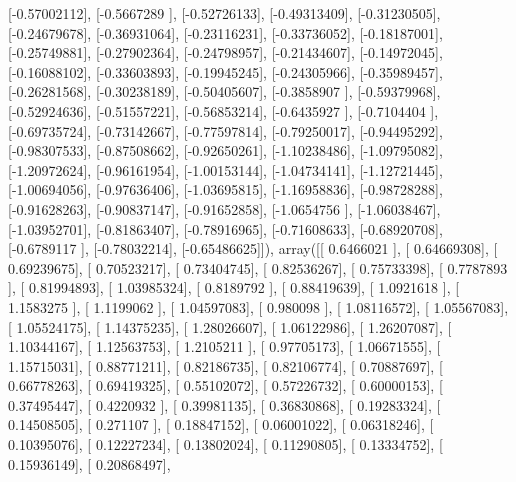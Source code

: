 \documentclass{article}
\begin{document}
       [-0.57002112],
       [-0.5667289 ],
       [-0.52726133],
       [-0.49313409],
       [-0.31230505],
       [-0.24679678],
       [-0.36931064],
       [-0.23116231],
       [-0.33736052],
       [-0.18187001],
       [-0.25749881],
       [-0.27902364],
       [-0.24798957],
       [-0.21434607],
       [-0.14972045],
       [-0.16088102],
       [-0.33603893],
       [-0.19945245],
       [-0.24305966],
       [-0.35989457],
       [-0.26281568],
       [-0.30238189],
       [-0.50405607],
       [-0.3858907 ],
       [-0.59379968],
       [-0.52924636],
       [-0.51557221],
       [-0.56853214],
       [-0.6435927 ],
       [-0.7104404 ],
       [-0.69735724],
       [-0.73142667],
       [-0.77597814],
       [-0.79250017],
       [-0.94495292],
       [-0.98307533],
       [-0.87508662],
       [-0.92650261],
       [-1.10238486],
       [-1.09795082],
       [-1.20972624],
       [-0.96161954],
       [-1.00153144],
       [-1.04734141],
       [-1.12721445],
       [-1.00694056],
       [-0.97636406],
       [-1.03695815],
       [-1.16958836],
       [-0.98728288],
       [-0.91628263],
       [-0.90837147],
       [-0.91652858],
       [-1.0654756 ],
       [-1.06038467],
       [-1.03952701],
       [-0.81863407],
       [-0.78916965],
       [-0.71608633],
       [-0.68920708],
       [-0.6789117 ],
       [-0.78032214],
       [-0.65486625]]), array([[ 0.6466021 ],
       [ 0.64669308],
       [ 0.69239675],
       [ 0.70523217],
       [ 0.73404745],
       [ 0.82536267],
       [ 0.75733398],
       [ 0.7787893 ],
       [ 0.81994893],
       [ 1.03985324],
       [ 0.8189792 ],
       [ 0.88419639],
       [ 1.0921618 ],
       [ 1.1583275 ],
       [ 1.1199062 ],
       [ 1.04597083],
       [ 0.980098  ],
       [ 1.08116572],
       [ 1.05567083],
       [ 1.05524175],
       [ 1.14375235],
       [ 1.28026607],
       [ 1.06122986],
       [ 1.26207087],
       [ 1.10344167],
       [ 1.12563753],
       [ 1.2105211 ],
       [ 0.97705173],
       [ 1.06671555],
       [ 1.15715031],
       [ 0.88771211],
       [ 0.82186735],
       [ 0.82106774],
       [ 0.70887697],
       [ 0.66778263],
       [ 0.69419325],
       [ 0.55102072],
       [ 0.57226732],
       [ 0.60000153],
       [ 0.37495447],
       [ 0.4220932 ],
       [ 0.39981135],
       [ 0.36830868],
       [ 0.19283324],
       [ 0.14508505],
       [ 0.271107  ],
       [ 0.18847152],
       [ 0.06001022],
       [ 0.06318246],
       [ 0.10395076],
       [ 0.12227234],
       [ 0.13802024],
       [ 0.11290805],
       [ 0.13334752],
       [ 0.15936149],
       [ 0.20868497],
\end{document}
